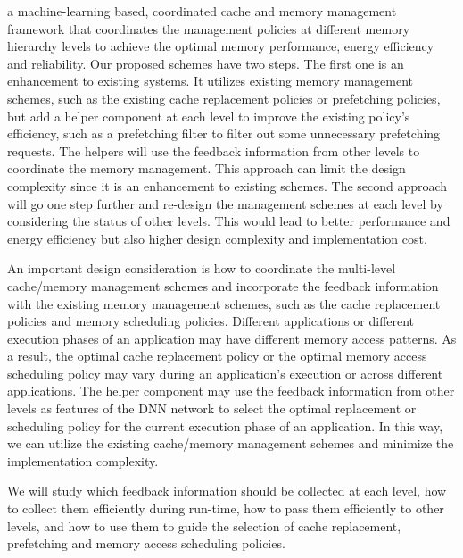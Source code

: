 a machine-learning based, coordinated cache and memory management framework that
coordinates the management policies at different memory hierarchy levels to
achieve the optimal memory performance, energy efficiency and reliability.  Our
proposed schemes have two steps. The first one is an enhancement to existing
systems. It utilizes existing memory management schemes, such as the existing
cache replacement policies or prefetching policies, but add a helper component
at each level to improve the existing policy's efficiency, such as a prefetching
filter to filter out some unnecessary prefetching requests.  The helpers will
use the feedback information from other levels to coordinate the memory
management.  This approach can limit the design complexity since it is an
enhancement to existing schemes.  The second approach will go one step further
and re-design the management schemes at each level by considering the status of
other levels.  This would lead to better performance and energy efficiency but
also higher design complexity and implementation cost.

An important design consideration is how to coordinate the multi-level
cache/memory management schemes and incorporate the feedback
information with the existing memory management schemes, such as
the cache replacement policies and memory scheduling policies.
Different applications or different execution phases of an application
may have different memory access patterns.  As a result, the optimal
cache replacement policy or the optimal memory access scheduling
policy may vary during an application's execution or across different
applications.  The helper component may use the feedback information
from other levels as features of the DNN network to select the
optimal replacement or scheduling policy for the current execution
phase of an application.  In this way, we can utilize the existing
cache/memory management schemes and minimize the implementation
complexity.

We will study which feedback information should be collected at each
level, how to collect them efficiently during run-time, how to pass
them efficiently to other levels, and how to use them to guide the
selection of cache replacement, prefetching and memory access scheduling
policies.

